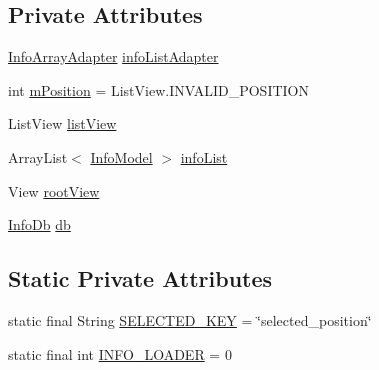\subsection*{Private Attributes}
\begin{DoxyCompactItemize}
\item 
\hyperlink{classorg_1_1buildmlearn_1_1infotemplate_1_1adapter_1_1InfoArrayAdapter}{Info\+Array\+Adapter} \hyperlink{classorg_1_1buildmlearn_1_1infotemplate_1_1fragment_1_1MainActivityFragment_afdd816fe3fd297cb1ec8a28ab9020ba4}{info\+List\+Adapter}
\item 
int \hyperlink{classorg_1_1buildmlearn_1_1infotemplate_1_1fragment_1_1MainActivityFragment_a1e4f511f01c23226bc048460568b1af4}{m\+Position} = List\+View.\+I\+N\+V\+A\+L\+I\+D\+\_\+\+P\+O\+S\+I\+T\+I\+ON
\item 
List\+View \hyperlink{classorg_1_1buildmlearn_1_1infotemplate_1_1fragment_1_1MainActivityFragment_ada4cfb2bb157dc67c2ad940e4ae2a7af}{list\+View}
\item 
Array\+List$<$ \hyperlink{classorg_1_1buildmlearn_1_1infotemplate_1_1data_1_1InfoModel}{Info\+Model} $>$ \hyperlink{classorg_1_1buildmlearn_1_1infotemplate_1_1fragment_1_1MainActivityFragment_a3e64b36333216cf89cb8f84c446c2c56}{info\+List}
\item 
View \hyperlink{classorg_1_1buildmlearn_1_1infotemplate_1_1fragment_1_1MainActivityFragment_a230066c6f9d010227ce26cacb8b0a59f}{root\+View}
\item 
\hyperlink{classorg_1_1buildmlearn_1_1infotemplate_1_1data_1_1InfoDb}{Info\+Db} \hyperlink{classorg_1_1buildmlearn_1_1infotemplate_1_1fragment_1_1MainActivityFragment_a30a2cba6d08416a27373082b7d6d33c4}{db}
\end{DoxyCompactItemize}
\subsection*{Static Private Attributes}
\begin{DoxyCompactItemize}
\item 
static final String \hyperlink{classorg_1_1buildmlearn_1_1infotemplate_1_1fragment_1_1MainActivityFragment_a81992e899ba7416b7f53eddd2191e778}{S\+E\+L\+E\+C\+T\+E\+D\+\_\+\+K\+EY} = \char`\"{}selected\+\_\+position\char`\"{}
\item 
static final int \hyperlink{classorg_1_1buildmlearn_1_1infotemplate_1_1fragment_1_1MainActivityFragment_ab0c2cac85c72dbc5e891493d7c11e2ff}{I\+N\+F\+O\+\_\+\+L\+O\+A\+D\+ER} = 0
\end{DoxyCompactItemize}


